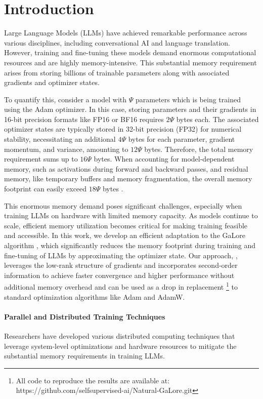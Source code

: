 
\vspace{-4mm}
\section{Introduction}
Large Language Models (LLMs) have achieved remarkable performance across various disciplines, including conversational AI and language translation. However, training and fine-tuning these models demand enormous computational resources and are highly memory-intensive. This substantial memory requirement arises from storing billions of trainable parameters along with associated gradients and optimizer states.

To quantify this, consider a model with $\Psi$ parameters which is being trained using the Adam optimizer. In this case, storing parameters and their gradients in 16-bit precision formats like FP16 or BF16 requires $2\Psi$ bytes each. The associated optimizer states are typically stored in 32-bit precision (FP32) for numerical stability, necessitating an additional $4\Psi$ bytes for each parameter, gradient momentum, and variance, amounting to $12\Psi$ bytes. Therefore, the total memory requirement sums up to $16\Psi$ bytes. When accounting for model-dependent memory, such as activations during forward and backward passes, and residual memory, like temporary buffers and memory fragmentation, the overall memory footprint can easily exceed $18\Psi$ bytes \citep{raffelExploringLimitsTransfer2020,touvronLlamaOpenFoundation2023,chowdheryPaLMScalingLanguage2022}.

This enormous memory demand poses significant challenges, especially when training LLMs on hardware with limited memory capacity. As models continue to scale, efficient memory utilization becomes critical for making training feasible and accessible. In this work, we develop an efficient adaptation to the GaLore algorithm \citep{zhao2024galore}, which significantly reduces the memory footprint during training and fine-tuning of LLMs by approximating the optimizer state. Our approach, \textit{\lowrank}, leverages the low-rank structure of gradients and incorporates second-order information to achieve faster convergence and higher performance without additional memory overhead and can be used as a drop in replacement \footnote[1]{All code to reproduce the results are available at: https://github.com/selfsupervised-ai/Natural-GaLore.git} to standard optimization algorithms like Adam and AdamW.

\paragraph{Parallel and Distributed Training Techniques}
Researchers have developed various distributed computing techniques that leverage system-level optimizations and hardware resources to mitigate the substantial memory requirements in training LLMs.

